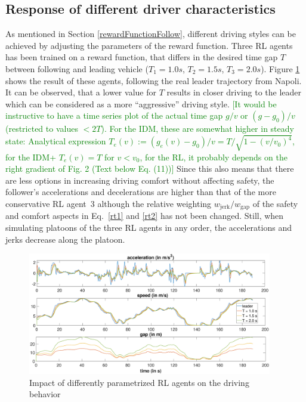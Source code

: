 \documentclass[review]{elsarticle}
\providecommand{\green}[1]{\textcolor{green}{#1}}
\providecommand{\martinc}[1]{\green{[#1]}} %
\providecommand{\sub}[1]{_{\mathrm{#1}}}  %
\providecommand{\3}{{\ss}}
\begin{document}
\subsection{Response of different driver characteristics}
\label{sec:differentT}

As mentioned in Section \ref{rewardFunctionFollow}, different driving styles
can be achieved by adjusting the parameters of the reward
function. Three RL agents has been trained on a reward function, that
differs in the desired time gap $T$ between following and
leading vehicle ($T_{1} = 1.0s$, $T_{2} = 1.5s$, 
$T_{3} =2.0s$). Figure \ref{fig:differentT} shows the result of these agents,
following the real leader trajectory from Napoli. It can be observed,
that a lower value for $T$ results in closer driving to the
leader which can be considered as a more ``aggressive''
driving style. \martinc{It would be instructive to have a time series
  plot of the actual time gap $g/v$ or $(g-g_0)/v$ (restricted to
  values $<2T$). For the IDM, these
  are somewhat higher in steady state: Analytical expression 
$T_e(v):=(g_e(v)-g_0)/v=T/\sqrt{1-(v/v_0)^4}$, for the IDM+ $T_e(v)=T$
  for $v<v_0$, for  the RL, it probably depends on the right gradient
  of Fig. 2 (Text below Eq. (11))}
Since this also means that there are less options in
increasing driving comfort without affecting safety, the follower's
accelerations and decelerations are higher than that of the more
conservative RL agent~3 although the relative
weighting $w\sub{jerk}/w\sub{gap}$ of the safety and comfort aspects in Eq.~\eqref{rt1} and \eqref{rt2} has not been
changed. Still, when simulating platoons of the three RL
  agents in any order, the accelerations and jerks decrease along the
  platoon.

\begin{figure}
	\centering
	\includegraphics[width=0.95\textwidth]{images/differentT}
	\caption{Impact of differently parametrized RL agents
          on the driving behavior }
	\label{fig:differentT}
\end{figure}
\end{document}
